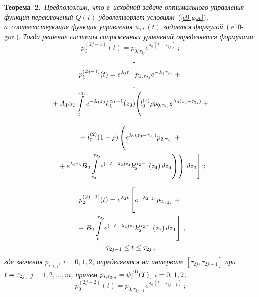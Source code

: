 \begin{multicols}{2}
\noindent
\textbf{Теорема~2.}\  
\textit{Предположим, что в~исходной задаче оптимального управления функция 
переключений  $Q(t)$ удовлетворяет условиям}~(\ref{e9-gor}), 
\textit{а~соответствующая функция управления $u_{1*}(t)$ задается формулой}~(\ref{e10-gor}). 
\textit{Тогда решение системы сопряженных уравнений определяется формулами}:
\begin{equation*} 
p^{(2j-1)}_0(t)=p_{0,\tau_{2j}} e^{\lambda_0(t-\tau_{2j})}\,;
\end{equation*}

\vspace*{-12pt}

\noindent
\begin{multline*}
p^{(2j-1)}_1(t)=  e^{\lambda_1 t} \left [ 
\vphantom{\int\limits^{\tau_{2j}}_{z_3}}
p_{1,\tau_{2j}}e^{-\lambda_1 \tau_{2j}} +{}\right.\\
{}+
A_1\alpha_1 \int\limits^{\tau_{2j}}_t e^{-\lambda_1 z_3}
k^{\alpha_1-1}_1(z_3) \!\left(\!
\vphantom{\int\limits^{\tau_{2j}}_{z_3}}
l^{(1)}_0 \rho p_{0,\tau_{2j}} e^{\lambda_0
\left(z_3 -\tau_{2j}\right)} +{}\right.\hspace*{-0.9pt}
\end{multline*}

\noindent
\begin{multline*}
{}+l^{(2)}_0 (1- \rho) \left(
\vphantom{\int\limits^{\tau_{2j}}_t e^{(-\delta -\lambda_2)z_1}}
e^{\lambda_2(z_3-\tau_{2j})}
p_{2,\tau_{2j}}+{}\right.\\
\left.\left.\left.{}+e^{\lambda_2 z_3}  B_2
\int\limits^{\tau_{2j}}_{z_3} e^{(-\delta -\lambda_2)z_4}k^{\alpha_2-1}_2(z_4) \,dz_4\right) 
\right) \, dz_3 \right]\,;
\end{multline*}

\vspace*{-12pt}

\noindent
\begin{multline*}
p^{(2j-1)}_2(t)=e^{\lambda_2t}\left[
\vphantom{\int\limits^{\tau_{2j}}_t e^{(-\delta -\lambda_2)z_1}}
e^{-\lambda_2 \tau_{2j}}p_{2,\tau_{2j}}+ {}\right.\\
\left.{}+ B_2
\int\limits^{\tau_{2j}}_t e^{(-\delta -\lambda_2)z_1}k^{\alpha_2-1}_2(z_1) \,dz_1 \right]\,, 
\\
\tau_{2j-1} \leq t \leq \tau_{2j}\,,
\end{multline*}
\textit{где значения $p_{i,\tau_{2j}}$, $i=0,1,2$, определяются на интервале 
$[\tau_{2j},\tau_{2j+1}]$ при $t\hm=\tau_{2j}$, $j=1,2,\ldots,m$, 
причем $p_{i,\tau_{2m}}\hm=\psi^{(0)}_{i}(T)$, $i\hm=0,1,2$};
\begin{equation*}
p^{(2j-2)}_0(t)=p_{0,\tau_{2j-1}} e^{\lambda_0(t-\tau_{2j-1})}\,;
\end{equation*}


\end{multicols}
